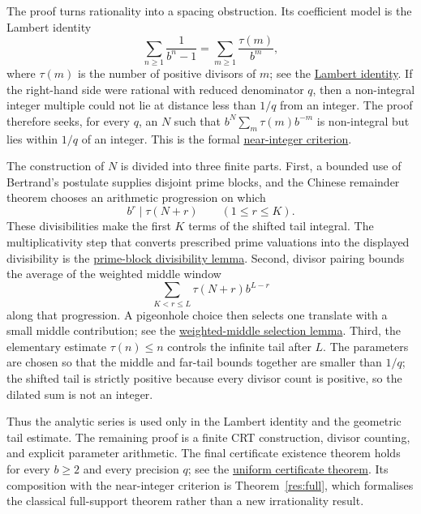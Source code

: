 \documentclass[11pt]{article}
\newcommand{\commit}{99f4bf47422abbd8757cbb22b50ba079d764d3a7}
\newcommand{\repobase}{https://github.com/wcook04/plectis-erdos/blob/\commit}
\newcommand{\PK}{Erdos249257}
\newcommand{\lword}[4]{\href{\repobase/\PK/#1\#L#2}{#4}}
\theoremstyle{definition}
\theoremstyle{remark}
\begin{document}
The proof turns rationality into a spacing obstruction.  Its coefficient
model is the Lambert identity
\[
 \sum_{n\geq 1}\frac{1}{b^n-1}
   =\sum_{m\geq 1}\frac{\tau(m)}{b^m},
\]
where $\tau(m)$ is the number of positive divisors of $m$; see the
\lword{CertificateKernel.lean}{6193}{erdosSum_full_support_eq_tsum_divisor_count}{Lambert identity}.
If the right-hand side were rational with reduced denominator $q$, then a
non-integral integer multiple could not lie at distance less than $1/q$ from an
integer.  The proof therefore seeks, for every $q$, an $N$ such that
$b^N\sum_m\tau(m)b^{-m}$ is non-integral but lies within $1/q$ of an integer.
This is the formal
\lword{CertificateKernel.lean}{6120}{irrational_of_int_mul_near_int}{near-integer criterion}.

The construction of $N$ is divided into three finite parts.  First, a bounded
use of Bertrand's postulate supplies disjoint prime blocks, and the Chinese remainder
theorem chooses an arithmetic progression on which
\[
        b^r\mid \tau(N+r) \qquad (1\leq r\leq K).
\]
These divisibilities make the first $K$ terms of the shifted tail integral.
The multiplicativity step that converts prescribed prime valuations into the
displayed divisibility is the
\lword{CertificateKernel.lean}{6505}{bpow_dvd_card_divisors_of_exact_prime_block}{prime-block divisibility lemma}.
Second, divisor pairing bounds the average of the weighted middle window
\[
   \sum_{K<r\leq L}\tau(N+r)b^{L-r}
\]
along that progression.  A pigeonhole choice then selects one translate with a
small middle contribution; see the
\lword{CertificateKernel.lean}{7574}{exists_first_block_progression_with_selected_weighted_middle}{weighted-middle selection lemma}.
Third, the elementary estimate $\tau(n)\leq n$ controls the infinite tail after
$L$.  The parameters are chosen so that the middle and far-tail bounds together
are smaller than $1/q$; the shifted tail is strictly positive because every
divisor count is positive, so the dilated sum is not an integer.

Thus the analytic series is used only in the Lambert identity and the
geometric tail estimate.  The remaining proof is a finite CRT construction,
divisor counting, and explicit parameter arithmetic.  The final certificate
existence theorem holds for every $b\geq2$ and every precision $q$; see the
\lword{CertificateKernel.lean}{8187}{exists_weighted_block_certificates}{uniform certificate theorem}.
Its composition with the near-integer criterion is
Theorem~\ref{res:full}, which formalises the classical full-support theorem rather than a new
irrationality result.
\end{document}
